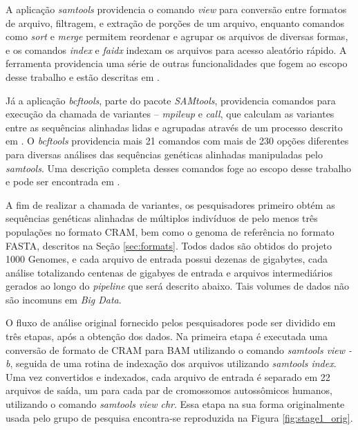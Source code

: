 \documentclass[cic,tc]{iiufrgs}
\begin{document}
A aplicação \textit{samtools} providencia o comando \textit{view} para conversão entre
formatos de arquivo, filtragem, e extração de porções de um arquivo, enquanto
comandos como \textit{sort} e \textit{merge} permitem reordenar e agrupar os
arquivos de diversas formas, e os comandos \textit{index} e \textit{faidx}
indexam os arquivos para acesso aleatório rápido. A ferramenta providencia uma
série de outras funcionalidades que fogem ao escopo desse trabalho e estão
descritas em \cite{danecek2021twelve}.

Já a aplicação \textit{bcftools}, parte do pacote \textit{SAMtools}, providencia comandos para
execução da chamada de variantes -- \textit{mpileup} e \textit{call}, que
calculam as variantes entre as sequências alinhadas lidas e agrupadas através
de um processo descrito em \cite{li2011improving}. O \textit{bcftools} providencia mais
21 comandos com mais de 230 opções diferentes para diversas análises das
sequências genéticas alinhadas manipuladas pelo \textit{samtools}. Uma descrição
completa desses comandos foge ao escopo desse trabalho e pode ser encontrada em
\cite{danecek2021twelve}.

A fim de realizar a chamada de variantes, os pesquisadores primeiro obtém as
sequências genéticas alinhadas de múltiplos indivíduos de pelo menos três
populações no formato CRAM, bem como o genoma de referência no formato FASTA,
descritos na Seção \ref{sec:formats}. Todos dados são obtidos do projeto 1000
Genomes, e cada arquivo de entrada possui dezenas de gigabytes, cada análise
totalizando centenas de gigabyes de entrada e arquivos intermediários gerados
ao longo do \textit{pipeline} que será descrito abaixo. Tais volumes de dados
não são incomuns em \textit{Big Data}.

O fluxo de análise original fornecido pelos pesquisadores pode ser dividido em
três etapas, após a obtenção dos dados. Na primeira etapa é executada uma
conversão de formato de CRAM para BAM utilizando o comando \textit{samtools
view -b}, seguida de uma rotina de indexação dos arquivos utilizando
\textit{samtools index}. Uma vez convertidos e indexados, cada arquivo de
entrada é separado em 22 arquivos de saída, um para cada par de cromossomos
autossômicos humanos, utilizando o comando \textit{samtools view chr}. Essa
etapa na sua forma originalmente usada pelo grupo de pesquisa encontra-se
reproduzida na Figura \ref{fig:stage1_orig}.
\end{document}
